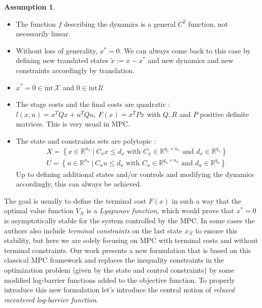 \documentclass[12pt]{article}
\theoremstyle{definition}
\newtheorem{assumption}[theorem]{Assumption}
\theoremstyle{remark}
\def\cal#1{\mathcal{#1}}
\newcommand{\R}{\mathbb{R}}
\begin{document}
\begin{assumption}~
	\begin{itemize}[label=\textbullet]
		\item The function $f$ describing the dynamics is a general $C^2$ function, not necessarily linear.
		\item Without loss of generality, $x^*=0$. We can always come back to this case by defining new translated states $\tilde{x}:=x-x^*$ and new dynamics and new constraints accordingly by translation.
		\item $x^*=0\in\mathrm{int}\,\cal{X}$ and $0\in\mathrm{int}\,\cal{U}$
		\item The stage costs and the final costs are quadratic : $l(x,u)=x^TQx+u^TQu,~F(x)=x^TPx$ with $Q,R$ and $P$ positive definite matrices.
		This is very usual in MPC.
		\item The state and constraints sets are polytopic :
		\begin{align*}
			X=\left\{x\in\R^{n_x}~|~C_xx\leq d_x\text{ with }C_x\in\R^{q_x\times n_x}\text{ and }d_x\in\R^{q_x}\right\}\\
			U=\left\{u\in\R^{n_u}~|~C_uu\leq d_u\text{ with }C_u\in\R^{q_u\times n_u}\text{ and }d_u\in\R^{q_u}\right\}
		\end{align*}
		Up to defining additional states and/or controls and modifying the dynamics accordingly, this can always be achieved.
	\end{itemize}
\end{assumption}
The goal is usually to define the terminal cost $F(x)$ in such a way that the optimal value function $V_N$ is a \textit{Lyapunov function}, which would prove that $x^*=0$ is asymptotically stable for the system controlled by the MPC.
In some cases the authors also include \textit{terminal constraints} on the last state $x_N$ to ensure this stability, but here we are solely focusing on MPC with terminal costs and without terminal constraints.
\newline
Our work presents a new formulation that is based on this classical MPC framework and replaces the inequality constraints in the optimization problem (given by the state and control constraints) by some modified log-barrier functions added to the objective function.
To properly introduce this new formulation let's introduce the central notion of \textit{relaxed recentered log-barrier function}.
\end{document}
